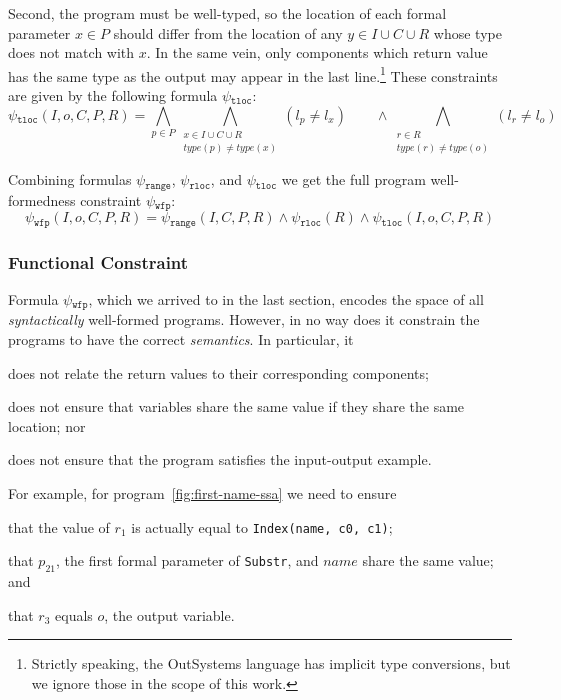 \noindent
Second, the program must be well-typed, so the location of each formal parameter
$x \in P$ should differ from the location of any $y \in I \cup C \cup R$ whose
type does not match with $x$.
In the same vein, only components which return value has the same type as the
output may appear in the last line.\footnote{Strictly speaking, the OutSystems
language has implicit type conversions, but we ignore those in the scope of this
work.}
These constraints are given by the following formula 
$\psi{}_{\mathtt{tloc}}$:
%
\[
  \psi{}_{\mathtt{tloc}}(I, o, C, P, R) =
  \bigwedge_{p \in P}
  \bigwedge_{\substack{x \in I \cup C \cup R \\ type(p) \neq type(x)}}
  (l_p \neq l_x)
  \qquad \wedge
  \bigwedge_{\substack{r \in R \\ type(r) \neq type(o)}}
  (l_r \neq l_o)
\]

Combining formulas $\psi{}_{\mathtt{range}}$, $\psi{}_{\mathtt{rloc}}$, and
$\psi{}_{\mathtt{tloc}}$ we get the full program well-formedness constraint
$\psi{}_{\mathtt{wfp}}$:
%
\[
  \psi{}_{\mathtt{wfp}}(I, o, C, P, R) =
  \psi{}_{\mathtt{range}}(I, C, P, R)
  \wedge \psi{}_{\mathtt{rloc}}(R)
  \wedge \psi{}_{\mathtt{tloc}}(I, o, C, P, R)
\]

\subsubsection{Functional Constraint}
\label{sec:functional-constraint}

Formula $\psi{}_{\mathtt{wfp}}$, which we arrived to in the last
section, encodes the space of all \textit{syntactically} well-formed programs.
However, in no way does it constrain the programs to have the correct
\textit{semantics}.
In particular, it 
\begin{enumerate*}[(1)]
\item \label{itm:fc-one} does not relate the return values to their
corresponding components;
\item \label{itm:fc-two} does not ensure that variables share the same value if they
share the same location; nor
\item \label{itm:fc-three} does not ensure that the program satisfies the
input-output example.
\end{enumerate*}
For example, for program~\ref{fig:first-name-ssa} we need to ensure
\begin{enumerate*}[(1)]
\item that the value of $r_1$ is actually equal to \lstinline{Index(name, c0, c1)};
\item that $p_{21}$, the first formal parameter of \lstinline{Substr}, and $name$
  share the same value; and
\item that $r_3$ equals $o$, the output variable.
\end{enumerate*}

